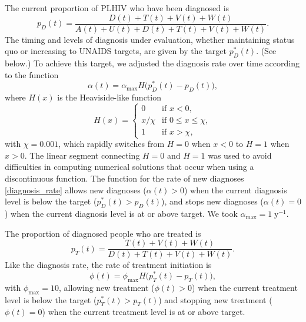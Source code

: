 \documentclass{article}
\begin{document}
The current proportion of PLHIV who have been diagnosed is
\begin{equation}
  p_D(t) = \frac{D(t) + T(t) + V(t) + W(t)}
  {A(t) + U(t) + D(t) + T(t) + V(t) + W(t)}.
\end{equation}
The timing and levels of diagnosis under evaluation, whether
maintaining status quo or increasing to UNAIDS targets, are given by
the target $p_D^*(t)$.  (See below.)  To achieve this target, we
adjusted the diagnosis rate over time according to the function
\begin{equation}
  \label{diagnosis_rate}
  \alpha(t) = \alpha_{\max} H\big(p_D^*(t) - p_D(t)\big),
\end{equation}
where $H(x)$ is the Heaviside-like function
\begin{equation}
  H(x) =
  \begin{cases}
    0 & \text{if $x < 0$},
    \\
    x / \chi & \text{if $0 \leq x \leq \chi$},
    \\
    1 & \text{if $x > \chi$},
  \end{cases}
\end{equation}
with $\chi = 0.001$, which rapidly switches from $H = 0$ when $x < 0$
to $H = 1$ when $x > 0$.  The linear segment connecting $H = 0$ and
$H = 1$ was used to avoid difficulties in computing numerical
solutions that occur when using a discontinuous function.  The
function for the rate of new diagnoses \eqref{diagnosis_rate} allows
new diagnoses ($\alpha(t) > 0$) when the current diagnosis level is
below the target ($p_D^*(t) > p_D(t)$), and stops new
diagnoses ($\alpha(t) = 0$) when the current diagnosis level is at or
above target.  We took $\alpha_{\max} = 1\;\text{y$^{-1}$}$.

The proportion of diagnosed people who are treated is
\begin{equation}
  p_T(t) = \frac{T(t) + V(t) + W(t)}{D(t) + T(t) + V(t) + W(t)}.
\end{equation}
Like the diagnosis rate, the rate of treatment initiation is
\begin{equation}
  \label{treatment_rate}
  \phi(t) = \phi_{\max} H\big(p_T^*(t) - p_T(t)\big),
\end{equation}
with $\phi_{\max} = 10$, allowing new treatment ($\phi(t) > 0$) when
the current treatment level is below the target ($p_T^*(t) > p_T(t)$)
and stopping new treatment ($\phi(t) = 0$) when the current treatment
level is at or above target.
\end{document}
